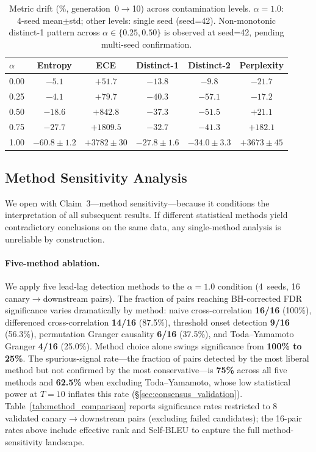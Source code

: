 \begin{table}[t]
\centering
\small
\caption{Metric drift (\%, generation~0$\to$10) across contamination levels. $\alpha{=}1.0$: 4-seed mean${\pm}$std; other levels: single seed (seed=42). Non-monotonic distinct-1 pattern across $\alpha \in \{0.25, 0.50\}$ is observed at seed=42, pending multi-seed confirmation.}
\label{tab:drift_summary}
\begin{tabular}{lccccc}
\toprule
$\alpha$ & Entropy & ECE & Distinct-1 & Distinct-2 & Perplexity \\
\midrule
0.00 & $-5.1$ & $+51.7$ & $-13.8$ & $-9.8$ & $-21.7$ \\
0.25 & $-4.1$ & $+79.7$ & $-40.3$ & $-57.1$ & $-17.2$ \\
0.50 & $-18.6$ & $+842.8$ & $-37.3$ & $-51.5$ & $+21.1$ \\
0.75 & $-27.7$ & $+1809.5$ & $-32.7$ & $-41.3$ & $+182.1$ \\
1.00 & $-60.8{\pm}1.2$ & $+3782{\pm}30$ & $-27.8{\pm}1.6$ & $-34.0{\pm}3.3$ & $+3673{\pm}45$ \\
\bottomrule
\end{tabular}
\end{table}


\subsection{Method Sensitivity Analysis}
\label{sec:method_sensitivity}

We open with Claim~3---method sensitivity---because it conditions the interpretation of all subsequent results.
If different statistical methods yield contradictory conclusions on the same data, any single-method analysis is unreliable by construction.

\paragraph{Five-method ablation.}
We apply five lead-lag detection methods to the $\alpha{=}1.0$ condition (4~seeds, 16 canary$\to$downstream pairs).
The fraction of pairs reaching BH-corrected FDR significance varies dramatically by method: naive cross-correlation \textbf{16/16} (100\%), differenced cross-correlation \textbf{14/16} (87.5\%), threshold onset detection \textbf{9/16} (56.3\%), permutation Granger causality \textbf{6/16} (37.5\%), and Toda--Yamamoto Granger \textbf{4/16} (25.0\%).
Method choice alone swings significance from \textbf{100\% to 25\%}.
The spurious-signal rate---the fraction of pairs detected by the most liberal method but not confirmed by the most conservative---is \textbf{75\%} across all five methods and \textbf{62.5\%} when excluding Toda--Yamamoto, whose low statistical power at $T{=}10$ inflates this rate (\S\ref{sec:consensus_validation}).
Table~\ref{tab:method_comparison} reports significance rates restricted to 8 validated canary$\to$downstream pairs (excluding failed candidates); the 16-pair rates above include effective rank and Self-BLEU to capture the full method-sensitivity landscape.


